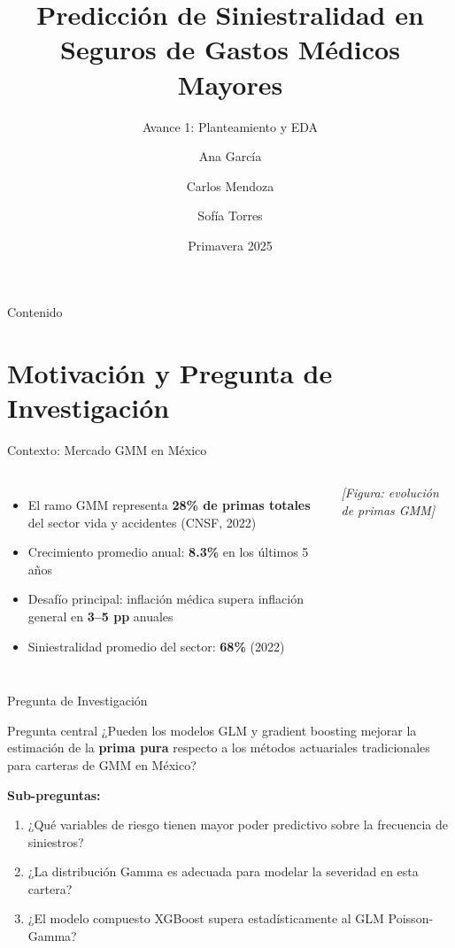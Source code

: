 \documentclass[aspectratio=169, 12pt]{beamer}
\title[Siniestralidad GMM]{Predicción de Siniestralidad en\\
Seguros de Gastos Médicos Mayores}
\subtitle{Avance 1: Planteamiento y EDA}
\author[García · Mendoza · Torres]{Ana García \and Carlos Mendoza \and Sofía Torres}
\institute[IBERO]{Universidad Iberoamericana Ciudad de México\\
Licenciatura en Actuaría}
\date{Primavera 2025}
\begin{document}

\begin{frame}
  \titlepage
\end{frame}

\begin{frame}{Contenido}
  \tableofcontents
\end{frame}

\section{Motivación y Pregunta de Investigación}

\begin{frame}{Contexto: Mercado GMM en México}
  \begin{columns}
      \begin{itemize}
        \item El ramo GMM representa \textbf{28\% de primas totales} del sector vida y accidentes (CNSF, 2022)
        \item Crecimiento promedio anual: \textbf{8.3\%} en los últimos 5 años
        \item Desafío principal: inflación médica supera inflación general en \textbf{3–5 pp} anuales
        \item Siniestralidad promedio del sector: \textbf{68\%} (2022)
      \end{itemize}
      \textit{[Figura: evolución de primas GMM]}
  \end{columns}
\end{frame}

\begin{frame}{Pregunta de Investigación}
  \begin{block}{Pregunta central}
    ¿Pueden los modelos GLM y gradient boosting mejorar la estimación de la \textbf{prima pura} respecto a los métodos actuariales tradicionales para carteras de GMM en México?
  \end{block}

  \vspace{0.5em}
  \textbf{Sub-preguntas:}
  \begin{enumerate}
    \item ¿Qué variables de riesgo tienen mayor poder predictivo sobre la frecuencia de siniestros?
    \item ¿La distribución Gamma es adecuada para modelar la severidad en esta cartera?
    \item ¿El modelo compuesto XGBoost supera estadísticamente al GLM Poisson-Gamma?
  \end{enumerate}
\end{frame}
\end{document}
